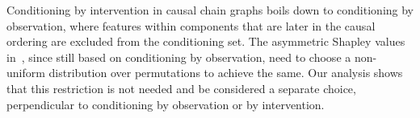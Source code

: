 \documentclass{article}
\begin{document}
Conditioning by intervention in causal chain graphs boils down to conditioning by observation, where features within components that are later in the causal ordering are excluded from the conditioning set. The asymmetric Shapley values in~\cite{frye2019asymmetric}, since still based on conditioning by observation, need to choose a non-uniform distribution over permutations to achieve the same. Our analysis shows that this restriction is not needed and be considered a separate choice, perpendicular to conditioning by observation or by intervention.

\end{document}
